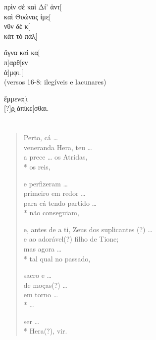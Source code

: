 {\begin{gkverse}
πρὶν σὲ καὶ Δί’ ἀντ[\\
καὶ Θυώνας ἰμε̣[\\
νῦν δὲ κ[\\
κὰτ τὸ πάλ̣[

ἄγνα καὶ κα̣[\\
π]αρθ[εν\\
ἀ]μφι.[\\
(versos 16-8: ilegíveis e lacunares)

ἔμμενα̣[ι\\
{[}?{]}ρ̣ ̣ἀπίκε[σθαι.
\end{gkverse}

\chapter*{}
\section*{}

\begin{verse}
Perto, cá \ldots{}\\
veneranda Hera, teu \ldots{}\\
a prece \ldots{} os Atridas,\\*
os reis,

e perfizeram \ldots{}\\
primeiro em redor \ldots{}\\
para cá tendo partido \ldots{}\\*
não conseguiam,

e, antes de a ti, Zeus dos suplicantes (?) \ldots{}\\
e ao adorável(?) filho de Tione;\\
mas agora \ldots{}\\*
tal qual no passado,

sacro e \ldots{}\\
de moças(?) \ldots{}\\
em torno \ldots{}\\*
\ldots{}

ser \ldots{}\\*
Hera(?), vir.
\end{verse}

}
